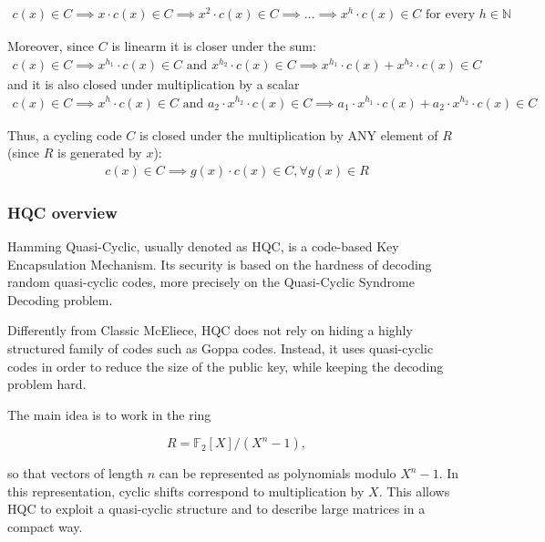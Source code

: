 \begin{align*}
    c(x) \in C \implies x \cdot c(x) \in C \implies x^2 \cdot c(x) \in C \implies \ldots \implies x^h \cdot c(x) \in C \text{ for every } h \in \mathbb{N}
\end{align*}

\noindent
Moreover, since $C$ is linearm it is closer under the sum:
\begin{align*}
    c(x) \in C \implies x^{h_1} \cdot c(x) \in C \text{ and } x^{h_2} \cdot c(x) \in C \implies x^{h_1} \cdot c(x) + x^{h_2} \cdot c(x) \in C
\end{align*}
\noindent
and it is also closed under multiplication by a scalar
\begin{align*}
    c(x) \in C \implies x^h \cdot c(x) \in C \text{ and } a_2 \cdot x^{h_2} \cdot c(x) \in C \implies a_1 \cdot x^{h_1} \cdot c(x) + a_2 \cdot x^{h_2} \cdot c(x) \in C
\end{align*}

\noindent
Thus, a cycling code $C$ is closed under the multiplication by ANY element of $R$ (since $R$ is generated by $x$):
\begin{align*}
    c(x) \in C \implies g(x) \cdot c(x) \in C, \forall g(x) \in R
\end{align*}


\subsubsection{HQC overview}

Hamming Quasi-Cyclic, usually denoted as HQC, is a code-based Key Encapsulation 
Mechanism. Its security is based on the hardness of decoding random quasi-cyclic 
codes, more precisely on the Quasi-Cyclic Syndrome Decoding problem.

\medskip

\noindent
Differently from Classic McEliece, HQC does not rely on hiding a highly structured family of codes such as Goppa codes. Instead, it uses quasi-cyclic codes in order to reduce the size of the public key, while keeping the decoding problem hard.
\medskip

\noindent
The main idea is to work in the ring

\[
R = \mathbb{F}_2[X]/(X^n - 1),
\]

\noindent
so that vectors of length \(n\) can be represented as polynomials modulo \(X^n-1\). In this representation, cyclic shifts correspond to multiplication by \(X\). This allows HQC to exploit a quasi-cyclic structure and to describe large matrices in a compact way.
\medskip

